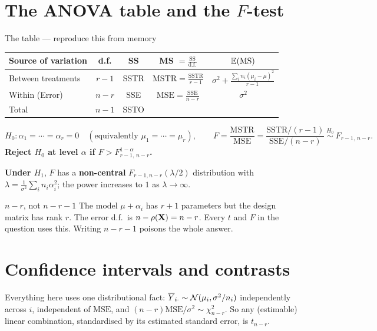 \documentclass[11pt]{article}
\begin{document}
\section{The ANOVA table and the $F$-test}

\begin{idea}{The table --- reproduce this from memory}
\begin{center}
\begin{tabular}{@{}lcccc@{}}
\toprule
Source of variation & d.f. & SS & MS $=\frac{\text{SS}}{\text{d.f.}}$ & $\mathbb{E}(\text{MS})$ \\
\midrule
Between treatments & $r-1$ & SSTR & $\mathrm{MSTR}=\frac{\mathrm{SSTR}}{r-1}$
  & $\sigma^2+\frac{\sum_i n_i(\mu_i-\mu)^2}{r-1}$ \\[3pt]
Within (Error) & $n-r$ & SSE & $\mathrm{MSE}=\frac{\mathrm{SSE}}{n-r}$ & $\sigma^2$ \\[3pt]
\midrule
Total & $n-1$ & SSTO & & \\
\bottomrule
\end{tabular}
\end{center}
\[
  H_0:\alpha_1=\cdots=\alpha_r=0 \quad(\text{equivalently } \mu_1=\cdots=\mu_r),
  \qquad
  F=\frac{\mathrm{MSTR}}{\mathrm{MSE}}
   =\frac{\mathrm{SSTR}/(r-1)}{\mathrm{SSE}/(n-r)}\ \overset{H_0}{\sim}\ F_{r-1,\,n-r}.
\]
\textbf{Reject $H_0$ at level $\alpha$ if $F>F^{1-\alpha}_{r-1,\,n-r}$.}
\end{idea}

\textbf{Under $H_1$}, $F$ has a \textbf{non-central} $F_{r-1,n-r}(\lambda/2)$ distribution
with $\lambda=\frac1{\sigma^2}\sum_i n_i\alpha_i^2$; the power increases to $1$ as
$\lambda\to\infty$.

\begin{confusion}{$n-r$, not $n-r-1$}
The model $\mu+\alpha_i$ has $r+1$ parameters but the design matrix has rank $r$. The error
d.f.\ is $n-\rho(\mathbf{X})=n-r$. Every $t$ and $F$ in the question uses this. Writing $n-r-1$
poisons the whole answer.
\end{confusion}

\section{Confidence intervals and contrasts}

Everything here uses one distributional fact: $\overline{Y}_{i\cdot}\sim\mathcal{N}(\mu_i,\sigma^2/n_i)$
independently across $i$, independent of $\mathrm{MSE}$, and
$(n-r)\mathrm{MSE}/\sigma^2\sim\chi^2_{n-r}$. So any (estimable) linear combination,
standardised by its estimated standard error, is $t_{n-r}$.
\end{document}
